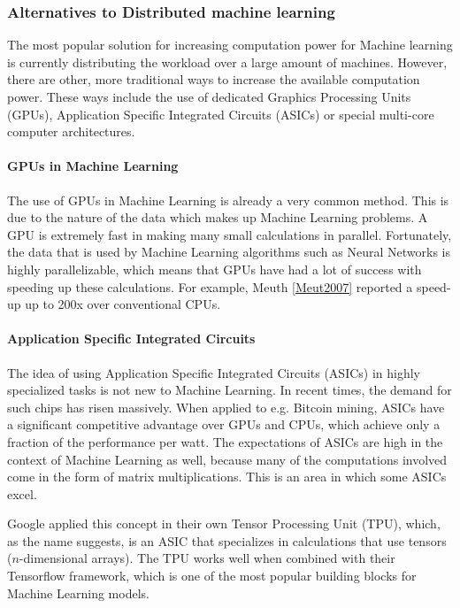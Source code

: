 
\subsubsection{Alternatives to Distributed machine learning}
The most popular solution for increasing computation power for Machine
learning is currently distributing the workload over a large amount of machines. However, there are other, more traditional ways to increase the available computation power. These ways include the use of dedicated Graphics Processing Units (GPUs), Application Specific Integrated Circuits (ASICs) or special multi-core computer architectures.

\paragraph{GPUs in Machine Learning}
The use of GPUs in Machine Learning is already a very common method. This is due to the nature of the data which makes up Machine Learning problems. A GPU is extremely fast in making many small calculations in parallel. Fortunately, the data that is used by Machine Learning algorithms such as Neural Networks is highly parallelizable, which means that GPUs have had a lot of success with speeding up these calculations. For example, Meuth \ref{Meut2007} reported a speed-up up to 200x over conventional CPUs.

\paragraph{Application Specific Integrated Circuits}
The idea of using Application Specific Integrated Circuits (ASICs) in highly specialized tasks is not new to Machine Learning. In recent times, the demand for such chips has risen massively\cite{Metz18}.
When applied to e.g. Bitcoin mining, ASICs have a significant competitive advantage over GPUs and CPUs, which achieve only a fraction of the performance per watt. The expectations of ASICs are high in the context of Machine Learning as well, because many of the computations involved come in the form of matrix multiplications. This is an area in which some ASICs excel.

Google applied this concept in their own Tensor Processing Unit (TPU)\cite{Sato17}, which, as the name suggests, is an ASIC that specializes in calculations that use tensors ($n$-dimensional arrays). The TPU works well when combined with their Tensorflow\cite{Tensorflow2015}\cite{Tensorflow2016} framework, which is one of the most popular building blocks for Machine Learning models.

